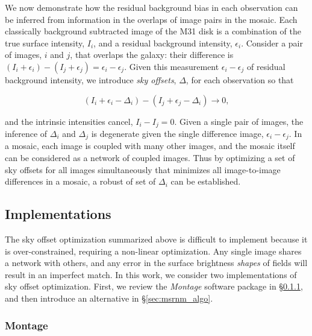 \documentclass[iop]{emulateapj}
\newcommand{\sw}[1]{\textit{#1}} %
\newcommand{\Sec}[1]{\S\ref{sec:#1}}  %
\begin{document}
We now demonstrate how the residual background bias in each observation can be inferred from information in the overlaps of image pairs in the mosaic.
Each classically background subtracted image of the M31 disk is a combination of the true surface intensity, $I_i$, and a residual background intensity, $\epsilon_i$.
Consider a pair of images, $i$ and $j$, that overlaps the galaxy: their difference is $(I_i+\epsilon_i) - (I_j+\epsilon_j) = \epsilon_i - \epsilon_j$.
Given this measurement $\epsilon_i - \epsilon_j$ of residual background intensity, we introduce \emph{sky offsets}, $\Delta$, for each observation so that

\begin{equation}
    (I_i + \epsilon_i - \Delta_i) - (I_j + \epsilon_j - \Delta_i) \rightarrow 0,
\end{equation}

\noindent and the intrinsic intensities cancel, $I_i - I_j = 0$.
Given a single pair of images, the inference of $\Delta_i$ and $\Delta_j$ is degenerate given the single difference image, $\epsilon_i-\epsilon_j$.
In a mosaic, each image is coupled with many other images, and the mosaic itself can be considered as a network of coupled images.
Thus by optimizing a set of sky offsets for all images simultaneously that minimizes all image-to-image differences in a mosaic, a robust of set of $\Delta_i$ can be established.

\subsection{Implementations}
\label{sec:offset_algos}

The sky offset optimization summarized above is difficult to implement because it is over-constrained, requiring a non-linear optimization.
Any single image shares a network with others, and any error in the surface brightness \emph{shapes} of fields will result in an imperfect match.
In this work, we consider two implementations of sky offset optimization.
First, we review the \sw{Montage} software package in \Sec{montage_algo}, and then introduce an alternative in \Sec{msrnm_algo}.

\subsubsection{Montage}
\label{sec:montage_algo}
\end{document}
